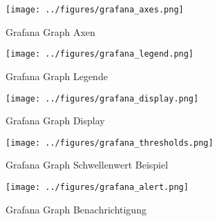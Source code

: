 \begin{figure}[tbp]
  \centering
  \texttt{[image: ../figures/grafana\_axes.png]}
  \caption{Grafana Graph Axen}
\label{figure:grafana_axes}
\end{figure}

\begin{figure}[tbp]
  \centering
  \texttt{[image: ../figures/grafana\_legend.png]}
  \caption{Grafana Graph Legende}
\label{figure:grafana_legend}
\end{figure}

\begin{figure}[tbp]
  \centering
  \texttt{[image: ../figures/grafana\_display.png]}
  \caption{Grafana Graph Display}
\label{figure:grafana_display}
\end{figure}

\begin{figure}[tbp]
  \centering
  \texttt{[image: ../figures/grafana\_thresholds.png]}
  \caption{Grafana Graph Schwellenwert Beispiel}
\label{figure:grafana_thresholds}
\end{figure}

\begin{figure}[tbp]
  \centering
  \texttt{[image: ../figures/grafana\_alert.png]}
  \caption{Grafana Graph Benachrichtigung}
\label{figure:grafana_alert}
\end{figure}
